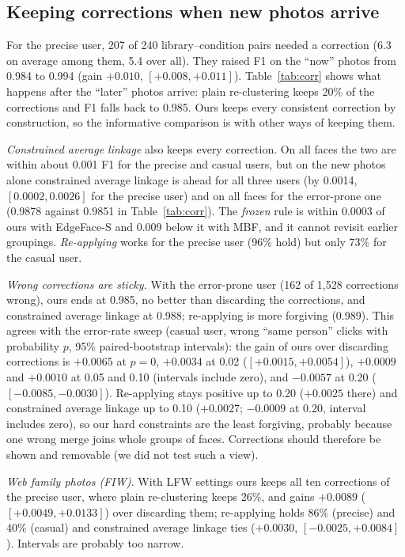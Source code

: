 \documentclass[conference]{IEEEtran}
\begin{document}
\subsection{Keeping corrections when new photos arrive}\label{sec:corr}
For the precise user, 207 of 240 library--condition pairs needed a correction (6.3 on average among them, 5.4 over all).
They raised F1 on the ``now'' photos from 0.984 to 0.994 (gain $+0.010$, $[+0.008,+0.011]$). Table~\ref{tab:corr} shows
what happens after the ``later'' photos arrive: plain re-clustering keeps 20\% of the corrections and F1 falls back to
0.985. Ours keeps every consistent correction by construction, so the informative comparison is with other ways of keeping them.

\emph{Constrained average linkage} also keeps every correction. On all faces the two are within about 0.001 F1 for the precise and
casual users, but on the new photos alone constrained average linkage is ahead for all three users (by 0.0014, $[0.0002,0.0026]$ for
the precise user) and on all faces for the error-prone one (0.9878 against 0.9851 in Table~\ref{tab:corr}). The \emph{frozen} rule is
within 0.0003 of ours with EdgeFace-S and 0.009 below it with MBF, and it cannot revisit earlier groupings. \emph{Re-applying} works for the
precise user (96\% hold) but only 73\% for the casual user.

\emph{Wrong corrections are sticky.} With the error-prone user (162 of 1{,}528 corrections wrong), ours ends at 0.985, no
better than discarding the corrections, and constrained average linkage at 0.988; re-applying is more forgiving (0.989). This agrees with the error-rate sweep (casual user, wrong ``same person'' clicks with probability $p$, 95\% paired-bootstrap
intervals): the gain of ours over discarding corrections is $+0.0065$ at $p=0$, $+0.0034$ at 0.02 ($[+0.0015,+0.0054]$),
$+0.0009$ and $+0.0010$ at 0.05 and 0.10 (intervals include zero), and $-0.0057$ at 0.20 ($[-0.0085,-0.0030]$). Re-applying stays
positive up to 0.20 ($+0.0025$ there) and constrained average linkage up to 0.10 ($+0.0027$; $-0.0009$ at 0.20, interval
includes zero), so our hard constraints are the least forgiving, probably because one
wrong merge joins whole groups of faces. Corrections should therefore be shown and removable (we did not test such a view).

\emph{Web family photos (FIW).} With LFW settings ours keeps all ten corrections of the precise user, where plain re-clustering
keeps 26\%, and gains $+0.0089$ ($[+0.0049,+0.0133]$) over discarding them; re-applying holds 86\% (precise) and 40\% (casual) and constrained average linkage ties
($+0.0030$, $[-0.0025,+0.0084]$). Intervals are probably too narrow.
\end{document}
